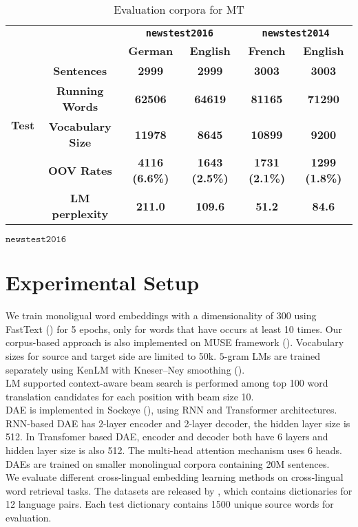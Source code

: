 \begin{table}[H]
	\centering
	
	\begin{tabular}{c|c|c|c|c|c}
		\hline
		\multirow{7}{*}{\textbf{Test}} & \textbf{}                      & \multicolumn{2}{c|}{\textbf{\texttt{newstest2016}}}    & \multicolumn{2}{c}{\textbf{\texttt{newstest2014}}}    \\ \cline{3-6} 
		& \multicolumn{1}{l|}{\textbf{}} & \textbf{German}       & \textbf{English}      & \textbf{French}       & \textbf{English}      \\ \cline{2-6} 
		& \textbf{Sentences}             & \textbf{2999}         & \textbf{2999}         & \textbf{3003}         & \textbf{3003}         \\ \cline{2-6} 
		& \textbf{Running Words}         & \textbf{62506}        & \textbf{64619}        & \textbf{81165}        & \textbf{71290}        \\ \cline{2-6} 
		& \textbf{Vocabulary Size}       & \textbf{11978}        & \textbf{8645}         & \textbf{10899}        & \textbf{9200}         \\ \cline{2-6} 
		& \textbf{OOV Rates}             & \textbf{4116 (6.6\%)} & \textbf{1643 (2.5\%)} & \textbf{1731 (2.1\%)} & \textbf{1299 (1.8\%)} \\ \cline{2-6} 
		& \textbf{LM perplexity}         & \textbf{211.0}        & \textbf{109.6}        & \textbf{51.2}         & \textbf{84.6}         \\ \hline
		
	\end{tabular}$\texttt{newstest2016}$
	\caption{Evaluation corpora for MT}
\end{table}

\section{Experimental Setup}
We train monoligual word embeddings with a dimensionality of 300 using FastText (\cite{bojanowski2016enriching}) for 5 epochs, only for words that have occurs at least 10 times. Our corpus-based approach is also implemented on MUSE framework (\cite{conneau2017word}). Vocabulary sizes for source and target side are limited to 50k.
$5$-gram LMs are trained separately using KenLM with Kneser–Ney smoothing (\cite{heafield2011kenlm}).\\
LM supported context-aware beam search is performed among top 100 word translation candidates for each position with beam size 10.\\
DAE is implemented in Sockeye (\cite{hieber2017sockeye}), using RNN and Transformer architectures. RNN-based DAE has 2-layer encoder and 2-layer decoder, the hidden layer size is 512. In Transfomer based DAE, encoder and decoder both have 6 layers and hidden layer size is also 512. The multi-head attention mechanism uses 6 heads. DAEs are trained on smaller monolingual corpora containing 20M sentences. \\
We evaluate different cross-lingual embedding learning methods on cross-lingual word retrieval tasks. The datasets are released by \cite{conneau2017word}, which contains dictionaries for 12 language pairs. Each test dictionary contains 1500 unique source words for evaluation.  
